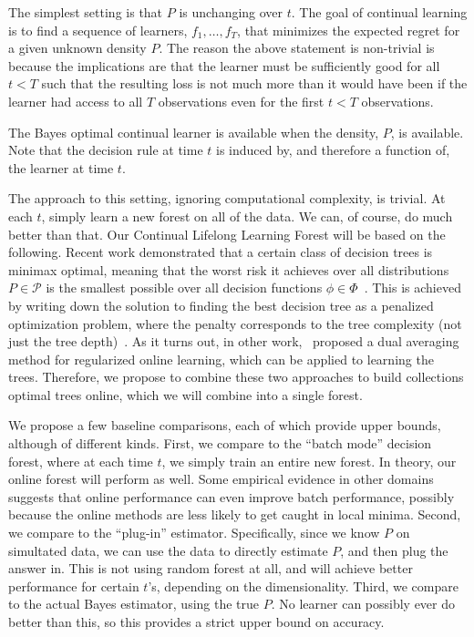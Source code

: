 \documentclass{article}
\begin{document}
The simplest setting is that $P$ is unchanging over $t$.  
The goal of continual learning is to find a sequence of learners, $f_1, \ldots, f_T$, that minimizes the expected regret for a given unknown density $P$.  The reason the above statement is non-trivial is because the implications are that the learner must be sufficiently good for all $t<T$ such that the resulting loss is not much more than it would have been if the learner had access to all $T$ observations even for the first $t<T$ observations.


The Bayes optimal continual learner is available when the density, $P$, is available. Note that the decision rule at time $t$ is induced by, and therefore a function of, the learner at time $t$. 


The approach to this setting, ignoring computational complexity, is trivial.  At each $t$, simply learn a new forest on all of the data. We can, of course, do much better than that.  Our Continual Lifelong Learning Forest will be based on the following.  Recent work demonstrated that a certain class of decision trees is minimax optimal, meaning that the worst risk it achieves over all distributions $P \in \mathcal{P}$ is the smallest possible over all decision functions $\phi \in \Phi$~\cite{Scott2006}.  This is achieved by writing down the solution to finding the best decision tree as a penalized optimization problem, where the penalty corresponds to the tree complexity (not just the tree depth)~\cite{Scott2005}. As it turns out, in other work,~\citet{Xiao2010} proposed a dual averaging method for regularized online learning, which can be applied to learning the trees. Therefore, we propose to combine these two approaches to build collections optimal trees online, which we will combine into a single forest. 

We propose a few baseline comparisons, each of which provide upper bounds, although of different kinds.  First, we compare to the ``batch mode'' decision forest, where at each time $t$, we simply train an entire new forest.  In theory, our online forest will perform as well.  Some empirical evidence in other domains suggests that online performance can even improve batch performance, possibly because the online methods are less likely to get caught in local minima.  Second, we compare to the ``plug-in'' estimator.  Specifically, since we know $P$ on simultated data, we can use the data to directly estimate $P$, and then plug the answer in.  This is not using random forest at all, and will achieve better performance for certain $t$'s, depending on the dimensionality.  Third, we compare to the actual Bayes estimator, using the true $P$.  No learner can possibly ever do better than this, so this provides a strict upper bound on accuracy. 
\end{document}
